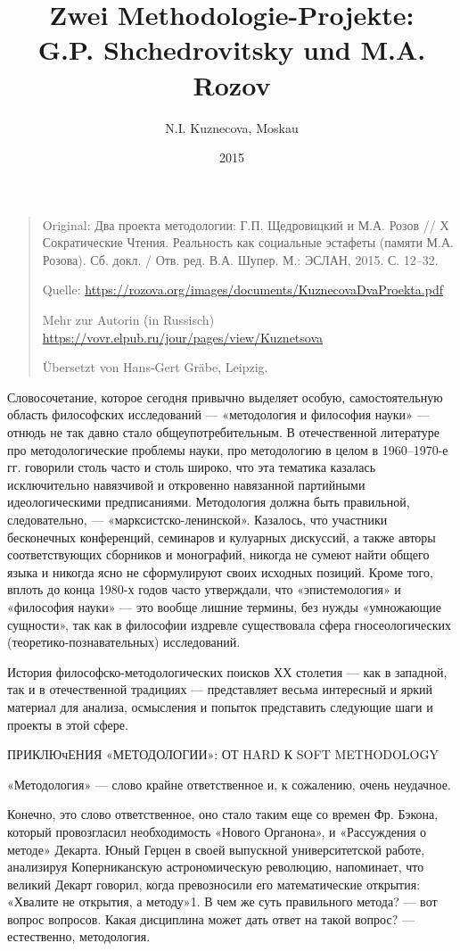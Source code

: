 \documentclass[11pt,a4paper]{article}
\title{Zwei Methodologie-Projekte:\\ G.P. Shchedrovitsky und M.A. Rozov}
\author{N.I. Kuznecova, Moskau}
\date{2015}
\begin{document}
\maketitle
\begin{quote}
  Original: \foreignlanguage{russian}{ Два проекта методологии:
    Г.П. Щедровицкий и М.А. Розов // Х Сократические Чтения. Реальность как
    социальные эстафеты (памяти М.А. Розова). Сб. докл. /
    Отв. ред. В.А. Шупер. М.: ЭСЛАН, 2015. С. 12–32.}
  
  Quelle: \url{https://rozova.org/images/documents/KuznecovaDvaProekta.pdf}

  Mehr zur Autorin (in Russisch)
  \url{https://vovr.elpub.ru/jour/pages/view/Kuznetsova}

  Übersetzt von Hans-Gert Gräbe, Leipzig. 
\end{quote}

Словосочетание, которое сегодня привычно выделяет особую, самостоятельную
область философских исследований — «методология и философия науки» — отнюдь не
так давно стало общеупотребительным. В отечественной литературе про
методологические проблемы науки, про методологию в целом в 1960–1970-е
гг. говорили столь часто и столь широко, что эта тематика казалась
исключительно навязчивой и откровенно навязанной партийными идеологическими
предписаниями. Методология должна быть правильной, следовательно, —
«марксистско-ленинской». Казалось, что участники бесконечных конференций,
семинаров и кулуарных дискуссий, а также авторы соответствующих сборников и
монографий, никогда не сумеют найти общего языка и никогда ясно не
сформулируют своих исходных позиций. Кроме того, вплоть до конца 1980-х
годов часто утверждали, что «эпистемология» и «философия науки» — это вообще
лишние термины, без нужды «умножающие сущности», так как в философии издревле
существовала сфера гносеологических (теоретико-познавательных) исследований.

История философско-методологических поисков ХХ столетия — как в западной,
так и в отечественной традициях — представляет весьма интересный и яркий
материал для анализа, осмысления и попыток представить следующие шаги и
проекты в этой сфере.

ПРИКЛЮчЕНИЯ «МЕТОДОЛОГИИ»: ОТ HARD К SOFT METHODOLOGY

«Методология» — слово крайне ответственное и, к сожалению, очень неудачное.

Конечно, это слово ответственное, оно стало таким еще со времен Фр. Бэкона,
который провозгласил необходимость «Нового Органона», и «Рассуждения о
методе» Декарта. Юный Герцен в своей выпускной университетской работе,
анализируя Коперниканскую астрономическую революцию, напоминает, что великий
Декарт говорил, когда превозносили его математические открытия: «Хвалите не
открытия, а методу»1. В чем же суть правильного метода? — вот вопрос
вопросов. Какая дисциплина может дать ответ на такой вопрос? — естественно,
методология.
\end{document}
